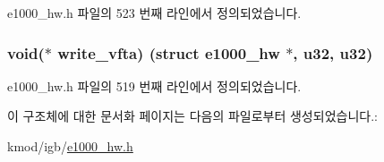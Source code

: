 e1000\+\_\+hw.\+h 파일의 523 번째 라인에서 정의되었습니다.

\subsubsection[{\texorpdfstring{write\+\_\+vfta}{write_vfta}}]{\setlength{\rightskip}{0pt plus 5cm}void($\ast$ write\+\_\+vfta) (struct {\bf e1000\+\_\+hw} $\ast$, {\bf u32}, {\bf u32})}\hypertarget{structe1000__mac__operations_ae1a26d952389938467bcead8138516ee}{}\label{structe1000__mac__operations_ae1a26d952389938467bcead8138516ee}


e1000\+\_\+hw.\+h 파일의 519 번째 라인에서 정의되었습니다.



이 구조체에 대한 문서화 페이지는 다음의 파일로부터 생성되었습니다.\+:\begin{DoxyCompactItemize}
\item 
kmod/igb/\hyperlink{kmod_2igb_2e1000__hw_8h}{e1000\+\_\+hw.\+h}\end{DoxyCompactItemize}
